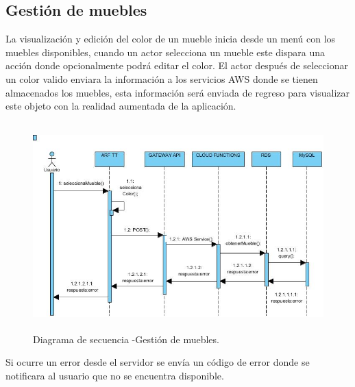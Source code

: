 \subsection{Gestión de muebles}
La visualización y edición del color de un mueble inicia desde un menú con los muebles disponibles, cuando un actor selecciona un mueble este dispara una acción donde opcionalmente podrá editar el color. El actor después de seleccionar un color valido enviara la información a los servicios AWS donde se tienen almacenados los muebles, esta información será enviada de regreso para visualizar este objeto con la realidad aumentada de la aplicación.
\vspace{5mm}
\begin{figure}[h!]
	\centering
	\includegraphics[width=14cm,height=8cm]{imagenes/analisis/DSgestionMuebles.jpg}
	\caption{Diagrama de secuencia -Gestión de muebles.}
	\label{fig:analogo}
\end{figure}
\vspace{5mm} \par
Si ocurre un error desde el servidor se envía un código de error donde se notificara al usuario que no se encuentra disponible.
\newpage
